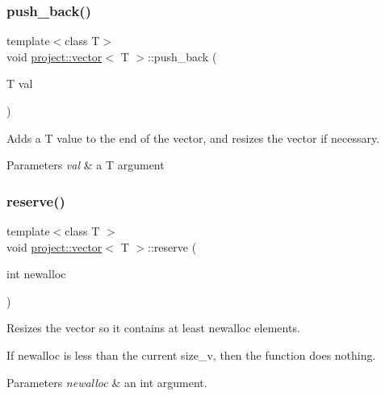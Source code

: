 \subsubsection{\texorpdfstring{push\_back()}{push\_back()}}
{\footnotesize\ttfamily template$<$class T$>$ \\
void \mbox{\hyperlink{classproject_1_1vector}{project\+::vector}}$<$ T $>$\+::push\+\_\+back (\begin{DoxyParamCaption}\item[{T}]{val }\end{DoxyParamCaption})\hspace{0.3cm}{\ttfamily [inline]}}



Adds a T value to the end of the vector, and resizes the vector if necessary. 


\begin{DoxyParams}{Parameters}
{\em val} & a T argument \\
\hline
\end{DoxyParams}
\mbox{\label{classproject_1_1vector_ab1cd63b3d7cd670c1b5c001513772d27}} 
\subsubsection{\texorpdfstring{reserve()}{reserve()}}
{\footnotesize\ttfamily template$<$class T $>$ \\
void \mbox{\hyperlink{classproject_1_1vector}{project\+::vector}}$<$ T $>$\+::reserve (\begin{DoxyParamCaption}\item[{int}]{newalloc }\end{DoxyParamCaption})\hspace{0.3cm}{\ttfamily [inline]}}



Resizes the vector so it contains at least newalloc elements. 

If newalloc is less than the current size\+\_\+v, then the function does nothing. 
\begin{DoxyParams}{Parameters}
{\em newalloc} & an int argument. \\
\hline
\end{DoxyParams}
\mbox{\label{classproject_1_1vector_a48ef25366c7155a905a0f2d4fa97f4fa}} 

